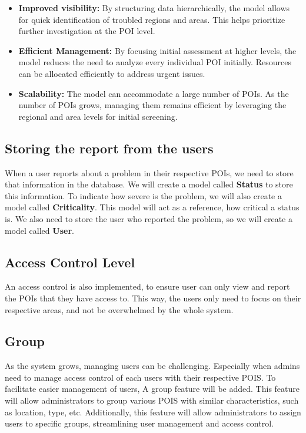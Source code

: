 \begin{itemize}
    \item \textbf{Improved visibility:} By structuring data hierarchically, the model allows for quick identification of troubled regions and areas. This helps prioritize further investigation at the POI level.
    \item \textbf{Efficient Management:}  By focusing initial assessment at higher levels, the model reduces the need to analyze every individual POI initially. Resources can be allocated efficiently to address urgent issues.
    \item \textbf{Scalability:} The model can accommodate a large number of POIs. As the number of POIs grows, managing them remains efficient by leveraging the regional and area levels for initial screening.
\end{itemize}

\subsection{Storing the report from the users}
\label{subsec:internship_experience:storing_report}

When a user reports about a problem in their respective POIs, we need to store that information in the database. We will create a model called \textbf{Status} to store this information. To indicate how severe is the problem, we will also create a model called \textbf{Criticality}. This model will act as a reference, how critical a status is. We also need to store the user who reported the problem, so we will create a model called \textbf{User}.

\subsection{Access Control Level}
\label{subsec:internship_experience:access_control_level}

An access control is also implemented, to ensure user can only view and report the POIs that they have access to. This way, the users only need to focus on their respective areas, and not be overwhelmed by the whole system.

\subsection{Group}
\label{subsec:internship_experience:group}

As the system grows, managing users can be challenging. Especially when admins need to manage access control of each users with their respective POIS\@. To facilitate easier management of users, A group feature will be added. This feature will allow administrators to group various POIS with similar characteristics, such as location, type, etc. Additionally, this feature will allow administrators to assign users to specific groups, streamlining user management and access control.

